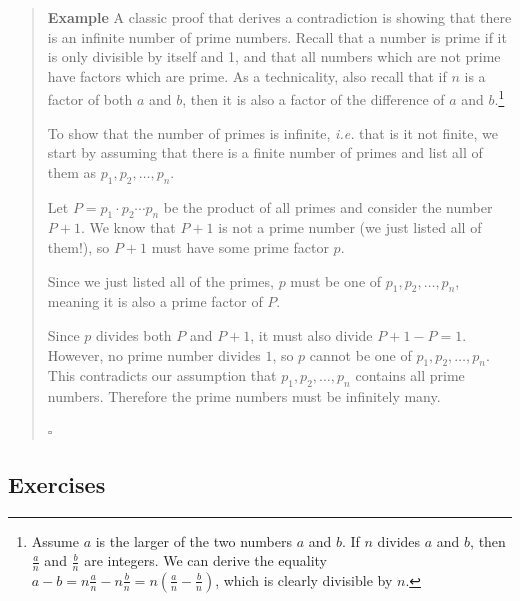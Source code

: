 \documentclass{tufte-handout}
\newcounter{example}
\newenvironment{example}
{\refstepcounter{example}\begin{quote}
\textbf{Example \arabic{example}}}
{

$\square$\end{quote}}
\begin{document}
\begin{example}
  A classic proof that derives a contradiction is showing that there is an
  infinite number of prime numbers. Recall that a number is prime
  if it is only divisible by itself and 1, and that all numbers
  which are not prime have factors which are prime. As a
  technicality, also recall that if $n$ is a factor of both $a$
  and $b$, then it is also a factor of the difference of $a$ and
  $b$.\footnote{Assume $a$ is the larger of the two numbers $a$ and
    $b$. If $n$ divides $a$ and $b$, then $\frac{a}{n}$ and
    $\frac{b}{n}$ are integers. We can derive the equality
    $a - b = n\frac{a}{n} - n\frac{b}{n} = n(\frac{a}{n} -
    \frac{b}{n})$, which is clearly divisible by $n$.}

  To show that the number of primes is infinite, \emph{i.e.} that is it not finite, we start by
  assuming that there is a finite number of primes and list all of
  them as $p_1, p_2, \dots,p_n$.
  \begin{compactenum}
  \item Let $P = p_1\cdot p_2\cdots p_n$ be the product of all
    primes and consider the number $P + 1$. We know that $P + 1$
    is not a prime number (we just listed all of them!), so
    $P + 1$ must have some prime factor $p$.
  \item Since we just listed all of the primes, $p$ must be one of
    $p_1, p_2, \dots,p_n$, meaning it is also a prime factor of
    $P$.
  \item Since $p$ divides both $P$ and $P + 1$, it must also
    divide $P + 1 - P = 1$. However, no prime number divides $1$,
    so $p$ cannot be one of $p_1, p_2, \dots,p_n$. This
    contradicts our assumption that $p_1, p_2, \dots,p_n$ contains
    all prime numbers. Therefore the prime numbers must be
    infinitely many.
  \end{compactenum}
\end{example}

\subsection{Exercises}
\end{document}
